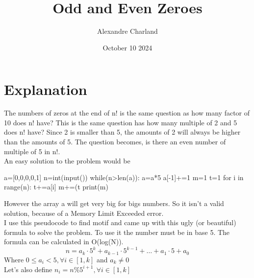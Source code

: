 \documentclass{article}
\title{Odd and Even Zeroes}
\author{Alexandre Charland}
\date{October 10 2024}
\begin{document}
\maketitle

\section{Explanation}
The numbers of zeros at the end of n! is the same question as how many factor of 10 does n! have? This is the same question has how many multiple of 2 and 5 does n! have? Since 2 is smaller than 5, the amounts of 2 will always be higher than the amounts of 5. The question becomes, is there an even number of multiple of 5 in n!.\\
An easy solution to the problem would be
\begin{python}
a=[0,0,0,0,1]
n=int(input())
while(n>len(a)):
    a=a*5
    a[-1]+=1
m=1
t=1
for i in range(n):
    t+=a[i]
    m+=(t%
print(m)
\end{python}
However the array a will get very big for bigs numbers. So it isn't a valid solution, because of a Memory Limit Exceeded error.\\
I use this pseudocode to find motif and came up with this ugly (or beautiful) formula to solve the problem. To use it the number must be in base 5. The formula can be calculated in O(log(N)).\
\[ n=a_{k}\cdot 5^{k}+a_{k-1}\cdot 5^{k-1}+\ldots+a_{1}\cdot 5 +a_{0} \]
Where $0 \le a_{i} < 5, \forall i \in [1,k]$ and $a_{k} \neq 0$\\
Let's also define $n_i = n\% 5^{i+1}, \forall i \in [1,k]$
\end{document}
